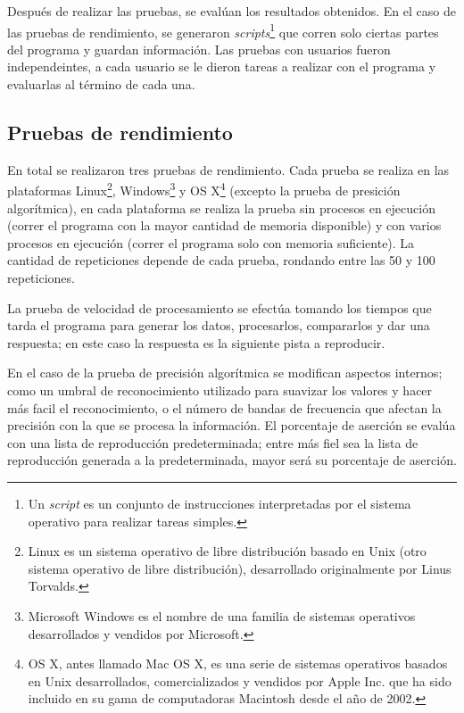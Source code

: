 Despu\'es de realizar las pruebas, se eval\'uan los resultados obtenidos. En el caso de las pruebas de rendimiento, se generaron {\em scripts}\footnote{Un {\em script} es un conjunto de instrucciones interpretadas por el sistema operativo para realizar tareas simples.} que corren solo ciertas partes del programa y guardan informaci\'on. Las pruebas con usuarios fueron independeintes, a cada usuario se le dieron tareas a realizar con el programa y evaluarlas al t\'ermino de cada una.

\subsection{Pruebas de rendimiento}

En total se realizaron tres pruebas de rendimiento. Cada prueba se realiza en las plataformas {\sc Linux}\footnote{{\sc Linux} es un sistema operativo de libre distribuci\'on basado en {\sc Unix} (otro sistema operativo de libre distribuci\'on), desarrollado originalmente por Linus Torvalds.}, {\sc Windows}\footnote{{\sc Microsoft Windows} es el nombre de una familia de sistemas operativos desarrollados y vendidos por {\sc Microsoft}.} y {\sc OS X}\footnote{{\sc OS X}, antes llamado {\sc Mac OS X}, es una serie de sistemas operativos basados en {\sc Unix} desarrollados, comercializados y vendidos por {\sc Apple Inc.} que ha sido incluido en su gama de computadoras {\sc Macintosh} desde el a\~no de 2002.} (excepto la prueba de presici\'on algor\'itmica), en cada plataforma se realiza la prueba sin procesos en ejecuci\'on (correr el programa con la mayor cantidad de memoria disponible) y con varios procesos en ejecuci\'on (correr el programa solo con memoria suficiente). La cantidad de repeticiones depende de cada prueba, rondando entre las 50 y 100 repeticiones.

\noindent La prueba de velocidad de procesamiento se efect\'ua tomando los tiempos que tarda el programa para generar los datos, procesarlos, compararlos y dar una respuesta; en este caso la respuesta es la siguiente pista a reproducir.

\noindent En el caso de la prueba de precisi\'on algor\'itmica se modifican aspectos internos; como un umbral de reconocimiento utilizado para suavizar los valores y hacer m\'as facil el reconocimiento, o el n\'umero de bandas de frecuencia que afectan la precisi\'on con la que se procesa la informaci\'on. El porcentaje de aserci\'on se eval\'ua con una lista de reproducci\'on predeterminada; entre m\'as fiel sea la lista de reproducci\'on generada a la predeterminada, mayor ser\'a su porcentaje de aserci\'on.

